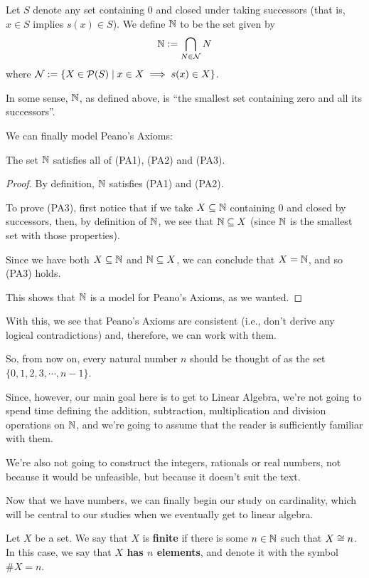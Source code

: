 \begin{df}
	Let $S$ denote any set containing $0$ and closed under taking successors (that is, $x\in S$ implies $s(x)\in S$). We define $\mathbb N$ to be the set given by
	\[\mathbb N:=\bigcap_{N\in \mathcal N} N\]where $\mathcal N:=\{X\in \mathcal P(S)\mid x\in X\implies s(x)\in X\}$.
\end{df}

In some sense, $\mathbb N$, as defined above, is ``the smallest set containing zero and all its successors''.

We can finally model Peano's Axioms:
\begin{theorem}
	The set $\mathbb N$ satisfies all of (PA1), (PA2) and (PA3).
\end{theorem}
\begin{proof}
	By definition, $\mathbb N$ satisfies (PA1) and (PA2).
	
	To prove (PA3), first notice that if we take $X\subseteq\mathbb N$ containing $0$ and closed by successors, then, by definition of $\mathbb N$, we see that $\mathbb N\subseteq X$ (since $\mathbb N$ is the smallest set with those properties).
	
	Since we have both $X\subseteq \mathbb N$ and $\mathbb N\subseteq X$, we can conclude that $X=\mathbb N$, and so (PA3) holds.
	
	This shows that $\mathbb N$ is a model for Peano's Axioms, as we wanted.
\end{proof}

With this, we see that Peano's Axioms are consistent (i.e., don't derive any logical contradictions) and, therefore, we can work with them.

So, from now on, every natural number $n$ should be thought of as the set $\{0,1,2,3,\cdots,n-1\}$.

Since, however, our main goal here is to get to Linear Algebra, we're not going to spend time defining the addition, subtraction, multiplication and division operations on $\mathbb N$, and we're going to assume that the reader is sufficiently familiar with them.

We're also not going to construct the integers, rationals or real numbers, not because it would be unfeasible, but because it doesn't suit the text.

\bigskip
Now that we have numbers, we can finally begin our study on cardinality, which will be central to our studies when we eventually get to linear algebra.

\begin{df}
	Let $X$ be a set. We say that $X$ is \textbf{finite} if there is some $n\in \mathbb N$ such that $X\cong n$. In this case, we say that \textbf{$X$ has $n$ elements}, and denote it with the symbol $\#X=n$.
\end{df}

